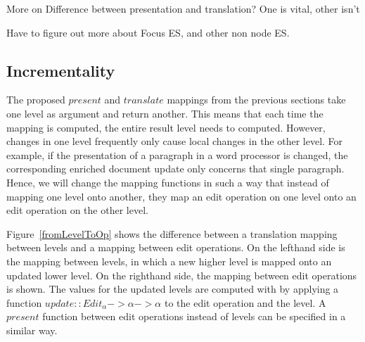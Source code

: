 More on Difference between presentation and translation? One is vital, other isn't

Have to figure out more about Focus ES, and other non node ES.










%										
%										
%										
\subsection{Incrementality}

The proposed $present$ and $translate$ mappings from the previous sections take one level as argument and return another. This means that each time the mapping is computed, the entire result level needs to computed. However, changes in one level frequently only cause local changes in the other level. For example, if the presentation of a paragraph in a word processor is changed, the corresponding enriched document update only concerns that single paragraph. Hence, we will change the mapping functions in such a way that instead of mapping one level onto another, they map an edit operation on one level onto an edit operation on the other level. 

Figure~\ref{fromLevelToOp} shows the difference between a translation mapping between levels and a mapping between edit operations. On the lefthand side is the mapping between levels, in which a new higher level is mapped onto an updated lower level. On the righthand side, the mapping between edit operations is shown. The values for the updated levels are computed with by applying a function
 $update :: Edit_\alpha -> \alpha -> \alpha$ to the edit operation and the level. A $present$ function between edit operations instead of levels can be specified in a similar way.

